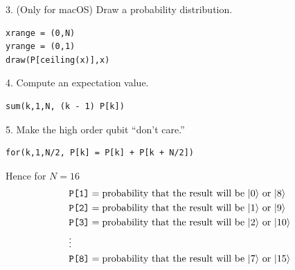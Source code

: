 3. (Only for macOS) Draw a probability distribution.
{\color{blue}
\begin{verbatim}
xrange = (0,N)
yrange = (0,1)
draw(P[ceiling(x)],x)
\end{verbatim}
}

4. Compute an expectation value.
{\color{blue}
\begin{verbatim}
sum(k,1,N, (k - 1) P[k])
\end{verbatim}
}

5. Make the high order qubit ``don't care.''
{\color{blue}
\begin{verbatim}
for(k,1,N/2, P[k] = P[k] + P[k + N/2])
\end{verbatim}
}

Hence for $N=16$
\begin{align*}
&\text{\tt P[1]}=\text{probability that the result will be $|0\rangle$ or $|8\rangle$}
\\
&\text{\tt P[2]}=\text{probability that the result will be $|1\rangle$ or $|9\rangle$}
\\
&\text{\tt P[3]}=\text{probability that the result will be $|2\rangle$ or $|10\rangle$}
\\
&\vdots
\\
&\text{\tt P[8]}=\text{probability that the result will be $|7\rangle$ or $|15\rangle$}
\end{align*}


